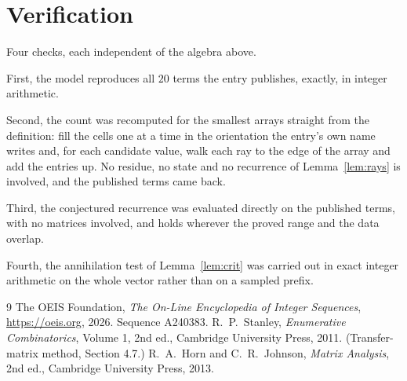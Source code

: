 \documentclass[11pt,a4paper]{article}
\theoremstyle{plain}
\theoremstyle{definition}
\begin{document}
\section{Verification}

Four checks, each independent of the algebra above.

First, the model reproduces all $20$ terms the entry publishes, exactly, in integer
arithmetic.

Second, the count was recomputed for the smallest arrays straight from the definition: fill the
cells one at a time in the orientation the entry's own name writes and, for each candidate
value, walk each ray to the edge of the array and add the entries up. No residue, no state and
no recurrence of Lemma~\ref{lem:rays} is involved, and the published terms came back.

Third, the conjectured recurrence was evaluated directly on the published terms, with no
matrices involved, and holds wherever the proved range and the data overlap.

Fourth, the annihilation test of Lemma~\ref{lem:crit} was carried out in exact integer
arithmetic on the whole vector rather than on a sampled prefix.

\begin{thebibliography}{9}
 The OEIS Foundation, \emph{The On-Line Encyclopedia of Integer
Sequences}, \url{https://oeis.org}, 2026. Sequence A240383.
 R.~P.~Stanley, \emph{Enumerative Combinatorics}, Volume 1, 2nd ed.,
Cambridge University Press, 2011. (Transfer-matrix method, Section 4.7.)
 R.~A.~Horn and C.~R.~Johnson, \emph{Matrix Analysis}, 2nd ed., Cambridge
University Press, 2013.
\end{thebibliography}
\end{document}
